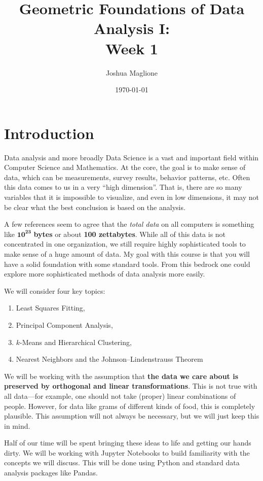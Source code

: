 \documentclass[a4paper, 12pt]{article}
\title{Geometric Foundations of Data Analysis I: \\ Week 1}
\author{Joshua Maglione}
\date{\today}
\numberwithin{equation}{section}
\numberwithin{figure}{section}
\theoremstyle{definition}
\begin{document}
\maketitle

\section{Introduction}

Data analysis and more broadly Data Science is a vast and important field within
Computer Science and Mathematics. At the core, the goal is to make sense of
data, which can be measurements, survey results, behavior patterns, etc. Often
this data comes to us in a very ``high dimension''. That is, there are so many
variables that it is impossible to visualize, and even in low
dimensions, it may not be clear what the best conclusion is based on the
analysis. 

A few references seem to agree that the \textit{total data} on all computers is
something like $\mathbf{10^{23}}$ \textbf{bytes} or about \textbf{100
zettabytes}. While all of this data is not concentrated in one organization, we
still require highly sophisticated tools to make sense of a huge amount of data.
My goal with this course is that you will have a solid foundation with some
standard tools. From this bedrock one could explore more sophisticated methods
of data analysis more easily. 

\bigskip

\noindent We will consider four key topics:
\begin{enumerate} 
	\item Least Squares Fitting,
	\item Principal Component Analysis,
	\item $k$-Means and Hierarchical Clustering,
	\item Nearest Neighbors and the Johnson--Lindenstrauss Theorem
\end{enumerate}

We will be working with the assumption that \textbf{the data we care about is
preserved by orthogonal and linear transformations}. This is not true with all
data---for example, one should not take (proper) linear combinations of people.
However, for data like grams of different kinds of food, this is completely
plausible. This assumption will not always be necessary, but we will just keep
this in mind. 

Half of our time will be spent bringing these ideas to life and getting our
hands dirty. We will be working with Jupyter Notebooks to build familiarity with
the concepts we will discuss. This will be done using Python and standard data
analysis packages like Pandas. 
\end{document}
